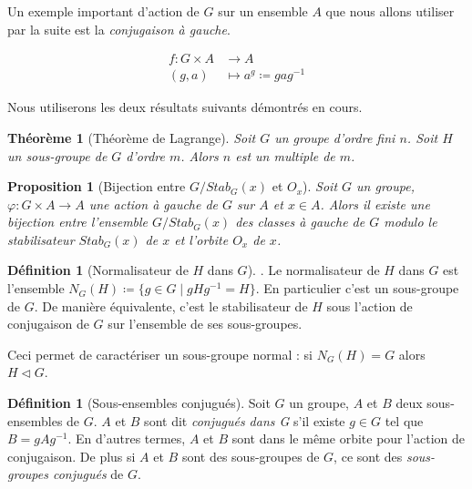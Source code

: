 \documentclass{article}
\theoremstyle{definition}
\newtheorem{definition}[subsubsection]{Définition}
\theoremstyle{plain}
\newtheorem{proposition}[subsubsection]{Proposition}
\newtheorem{theorem}[subsubsection]{Théorème}
\theoremstyle{plain}
\theoremstyle{plain}
\theoremstyle{plain}
\theoremstyle{definition}
\theoremstyle{plain}
\theoremstyle{plain}
\begin{document}
Un exemple important d'action de \( G \) sur un ensemble \( A \) que nous allons utiliser par la suite est la \textit{conjugaison à gauche}.


\begin{align*}
	f : G \times A &\to A \\
	(g,a) &\mapsto a^{g} \coloneq gag^{-1}
\end{align*}

Nous utiliserons les deux résultats suivants démontrés en cours.  
\begin{theorem}[Théorème de Lagrange] \label{thm:lagrange}
	Soit \( G \) un groupe d'ordre fini \( n \). Soit \( H \) un sous-groupe de \( G \) d'ordre \( m \). Alors \( n \) est un multiple de \( m \).
\end{theorem}

\begin{proposition}[Bijection entre \ensuremath{G/Stab_G(x)} et \ensuremath{O_x}]\label{prop:bij}
	Soit \( G \) un groupe, \( \varphi : G \times A \rightarrow A \) une action à gauche de \( G \) sur \( A \) et \( x \in A \). Alors il existe une bijection entre l'ensemble \( G/Stab_G(x) \) des classes à gauche de \( G \) modulo le stabilisateur \( Stab_G(x) \) de \( x \) et l'orbite \( O_x \) de \( x \).
\end{proposition}

\begin{definition}[Normalisateur de \ensuremath{H} dans \ensuremath{G}]\cite[p.~217]{chen2024napkin}.
	Le normalisateur de \( H \) dans \( G \) est l'ensemble 
	\( N_{G}({H}) \coloneq \{ g \in G \mid gHg^{-1} = H \} \).
	En particulier c'est un sous-groupe de \( G \). De manière équivalente, c'est le stabilisateur de \( H \) sous l'action de conjugaison de \( G \) sur l'ensemble de ses sous-groupes. 
\end{definition}

Ceci permet de caractériser un sous-groupe normal : si \( N_G(H) = G \) alors \( H \triangleleft G \).

\begin{definition}[Sous-ensembles conjugués]\cite[p. ~123]{dummit2003abstract} 
	Soit \( G \) un groupe, \( A \) et \( B \) deux sous-ensembles de \( G \). 
	\( A \) et \( B \) sont dit 
	\textit{conjugués dans G} s'il existe \( g \in G \) tel que \( B = gAg^{-1} \).
	En d'autres termes, \( A \) et \( B \) sont dans le même orbite pour l'action de conjugaison. De plus si \( A \) et \( B \) sont des sous-groupes de \( G \), ce sont des \textit{sous-groupes conjugués} de \( G \).
\end{definition}
\end{document}
